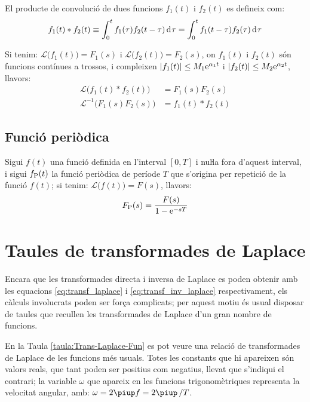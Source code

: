 El producte de convolució de dues funcions $f_1(t)$ i $f_2(t)$ es
defineix com:
\begin{equation}
    f_1(t) * f_2(t) \equiv \int_0^t f_1(\tau) f_2(t-\tau) \diff\tau =
    \int_0^t f_1(t-\tau) f_2(\tau) \diff\tau
\end{equation}

Si tenim: $\mathcal{L} \bigl(f_1(t) \bigr) = F_1(s)$ i $\mathcal{L}
\bigl(f_2(t) \bigr) = F_2(s)$, on $f_1(t)$ i $f_2(t)$ són funcions
contínues a trossos, i compleixen $|f_1(t)|\leq M_1\mathrm{e}^{\alpha_1 t}$
i $|f_2(t)|\leq M_2\mathrm{e}^{\alpha_2 t}$, llavors:
\begin{align}
    \mathcal{L} \bigl( f_1(t) * f_2(t) \bigr) &= F_1(s) F_2(s)\\
    \mathcal{L}^{-1} \bigl( F_1(s) F_2(s) \bigr) &= f_1(t) * f_2(t)
\end{align}

\subsection{Funció periòdica}

Sigui $f(t)$ una funció definida en l'interval $[0,T]$ i nuŀla
fora d'aquest interval, i sigui $f_\mathrm{P}(t)$ la funció periòdica de
període $T$ que s'origina per repetició de la funció $f(t)$; si
tenim: $\mathcal{L} \bigl(f(t) \bigr) = F(s)$, llavors:
\begin{equation}
    F_\mathrm{P}(s) = \frac{F(s)}{1-\mathrm{e}^{-sT}}
\end{equation}

\section{Taules de transformades de Laplace}

Encara que les transformades directa i inversa de Laplace es poden
obtenir amb les equacions \eqref{eq:transf_laplace} i
\eqref{eq:transf_inv_laplace} respectivament, els càlculs
involucrats poden ser força complicats; per aquest motiu és usual
disposar de taules que recullen les transformades de Laplace d'un
gran nombre de funcions.

En la Taula \vref{taula:Trans-Laplace-Fun} es pot veure una relació de
transformades de Laplace de les funcions més usuals. Totes les
constants que hi apareixen són valors reals, que tant poden ser
positius com negatius, llevat que s'indiqui el contrari; la variable
$\omega$ que apareix en les funcions trigonomètriques representa la
velocitat angular, amb: $\omega=2\piup f=2\piup\,/T$.

